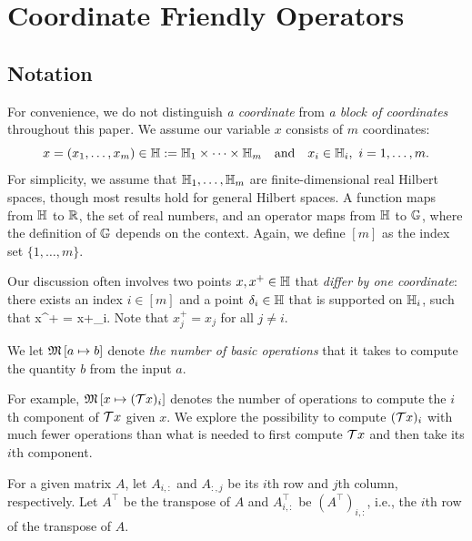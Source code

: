 \section{Coordinate Friendly Operators}\label{sec:cuf}

\subsection{Notation}
For convenience, we do not distinguish \emph{a coordinate} from \emph{a block of coordinates} throughout this paper. We assume our variable $x$ consists of $m$ coordinates: $$x = (x_1, \ldots, x_m) \in\mathbb{H} := \mathbb{H}_1 \times \cdots \times \mathbb{H}_m\quad\mbox{and}\quad x_i\in\mathbb{H}_i,~ i=1,\ldots,m.$$ For simplicity, we assume that $\mathbb{H}_1,\ldots,\mathbb{H}_m$ are finite-dimensional real Hilbert spaces, though most results hold for general Hilbert spaces.
A function maps from $\mathbb{H}$ to $\mathbb{R}$, the set of real numbers, and an operator maps from $\mathbb{H}$ to $\mathbb{G}$, where the definition of $\mathbb{G}$ depends on the context. Again, we define $[m]$ as the index set $\{1, \ldots, m\}$.

Our discussion often involves two points $x,x^+\in\mathbb{H}$ that \emph{differ by one coordinate}: there exists an index $i\in [m]$ and a point $\delta_i\in\mathbb{H}$ that is supported on $\mathbb{H}_i$, such that
\beq\label{singleupdate}
x^+ = x+\delta_i.
\eeq
Note that $x^+_j=x_j$ for all $j\not=i$.
\begin{definition}
We let $\mathfrak{M}\left[{a}\mapsto {b}\right]$ denote \emph{the number of basic operations} that it takes to compute the quantity $b$ from the  input $a$.
\end{definition}
For example, $\mathfrak{M}\left[{x}\mapsto {({\mathcal{T}}x)_i}\right]$ denotes the number of operations to compute the $i$th component of ${\mathcal{T}} x$ given $x$. We explore the possibility to compute  $({\mathcal{T}} x)_i$ with much fewer operations than what is needed to first compute ${\mathcal{T}} x$ and  then take its $i$th component. %

For a given matrix $A$, let $A_{i,:}$ and $A_{:,j}$ be its $i$th row and $j$th column, respectively. Let $A^\top$ be the transpose of $A$ and $A^\top_{i,:}$ be $(A^\top)_{i,:}$, i.e., the $i$th row of the transpose of $A$.

